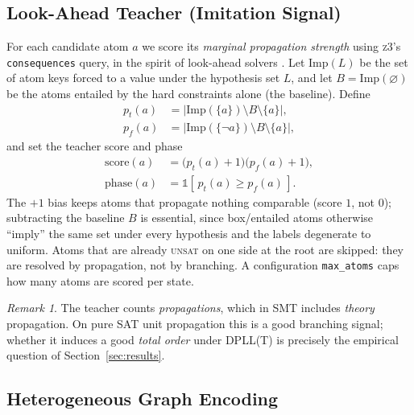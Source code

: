 \documentclass[letterpaper]{article} %
\theoremstyle{definition}
\theoremstyle{plain}
\theoremstyle{remark}
\newtheorem{remark}{Remark}
\newcommand{\solver}{\textsc{z3}}
\newcommand{\Imp}{\mathrm{Imp}}
\newcommand{\score}{\mathrm{score}}
\begin{document}
\subsection{Look-Ahead Teacher (Imitation Signal)}
\label{sec:teacher}

For each candidate atom $a$ we score its \emph{marginal propagation strength}
using \solver{}'s \texttt{consequences} query, in the spirit of look-ahead
solvers \citep{heule2021lookahead}. Let $\Imp(L)$ be the set of atom keys
forced to a value under the hypothesis set $L$, and let
$B=\Imp(\varnothing)$ be the atoms entailed by the hard constraints alone
(the baseline). Define
\begin{align*}
p_t(a) &= \bigl|\Imp(\{a\})\setminus B\setminus\{a\}\bigr|,\\
p_f(a) &= \bigl|\Imp(\{\neg a\})\setminus B\setminus\{a\}\bigr|,
\end{align*}
and set the teacher score and phase
\begin{equation}
\begin{aligned}
\score(a) &= \bigl(p_t(a)+1\bigr)\bigl(p_f(a)+1\bigr),\\
\mathrm{phase}(a) &= \mathbb{1}[\,p_t(a)\ge p_f(a)\,].
\end{aligned}
\label{eq:teacher}
\end{equation}
The $+1$ bias keeps atoms that propagate nothing comparable (score $1$, not
$0$); subtracting the baseline $B$ is essential, since box/entailed atoms
otherwise ``imply'' the same set under every hypothesis and the labels
degenerate to uniform. Atoms that are already \textsc{unsat} on one side at
the root are skipped: they are resolved by propagation, not by branching. A
configuration \texttt{max\_atoms} caps how many atoms are scored per state.

\begin{remark}
The teacher counts \emph{propagations}, which in SMT includes \emph{theory}
propagation. On pure SAT unit propagation this is a good branching signal;
whether it induces a good \emph{total order} under \textsc{DPLL(T)} is
precisely the empirical question of Section~\ref{sec:results}.
\end{remark}

\subsection{Heterogeneous Graph Encoding}
\label{sec:graph}
\end{document}
